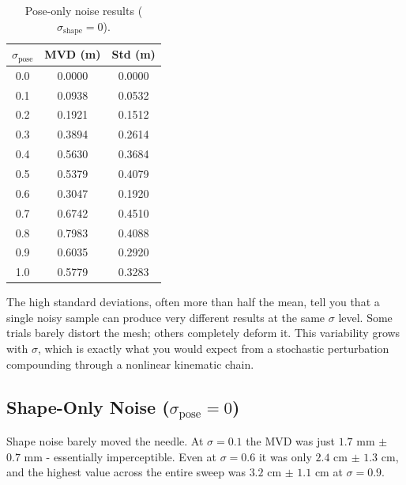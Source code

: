 \documentclass[final]{article}
\begin{document}
\begin{table}[H]
\centering
\caption{Pose-only noise results ($\sigma_{\text{shape}} = 0$).}
\label{tab:pose_only}
\begin{tabular}{|c|c|c|}
    \hline
    $\sigma_{\text{pose}}$ & MVD (m) & Std (m) \\ \hline\hline
    0.0 & 0.0000 & 0.0000 \\ \hline
    0.1 & 0.0938 & 0.0532 \\ \hline
    0.2 & 0.1921 & 0.1512 \\ \hline
    0.3 & 0.3894 & 0.2614 \\ \hline
    0.4 & 0.5630 & 0.3684 \\ \hline
    0.5 & 0.5379 & 0.4079 \\ \hline
    0.6 & 0.3047 & 0.1920 \\ \hline
    0.7 & 0.6742 & 0.4510 \\ \hline
    0.8 & 0.7983 & 0.4088 \\ \hline
    0.9 & 0.6035 & 0.2920 \\ \hline
    1.0 & 0.5779 & 0.3283 \\ \hline
\end{tabular}
\end{table}

The high standard deviations, often more than half the mean, tell you 
that a single noisy sample can produce very different results at the same 
$\sigma$ level. Some trials barely distort the mesh; others completely deform 
it. This variability grows with $\sigma$, which is exactly what you would 
expect from a stochastic perturbation compounding through a nonlinear kinematic 
chain.

\subsection{Shape-Only Noise ($\sigma_{\text{pose}} = 0$)}

Shape noise barely moved the needle. At $\sigma = 0.1$ the MVD was just 
$1.7$ mm $\pm$ $0.7$ mm - essentially imperceptible. Even at $\sigma = 0.6$ 
it was only $2.4$ cm $\pm$ $1.3$ cm, and the highest value across the entire 
sweep was $3.2$ cm $\pm$ $1.1$ cm at $\sigma = 0.9$.
\end{document}

